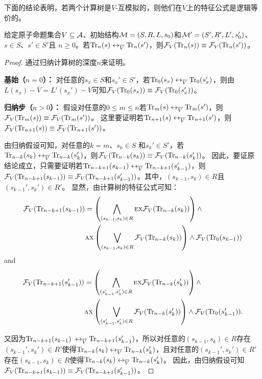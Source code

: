下面的结论表明，若两个计算树是$V$-互模拟的，则他们在$V$上的特征公式是逻辑等价的。
\begin{lemma}\label{lem:Vb:TrFormula:Equ}
	给定原子命题集合$V\subseteq {\cal A}$、初始结构${\cal M}=(S,R,L,s_0)$和${\cal M}'=(S',R',L',s_0')$、$s\in S$、$s'\in S'$且 $n\ge 0$。若$\textrm{Tr}_n(s) \leftrightarrow_{\overline V} \textrm{Tr}_n(s')$，则${\cal F}_V(\textrm{Tr}_n(s)) \equiv {\cal F}_V(\textrm{Tr}_n(s'))$。
\end{lemma}
\begin{proof}
	通过归纳计算树的深度$n$来证明。
	
	\textbf{基始（$n=0$）：} 对任意的$s_x\in S$和$s_x' \in S'$，若$\textrm{Tr}_0(s_x) \leftrightarrow_{\overline V} \textrm{Tr}_0(s_x')$，则由$L(s_x) - \overline V = L'(s_x') - \overline V$可知${\cal F}_V(\textrm{Tr}_0(s_x)) \equiv {\cal F}_V(\textrm{Tr}_0(s_x'))$。
	
	\textbf{归纳步（$n>0$）：} 假设对任意的$0\leq m \leq n$若$\textrm{Tr}_m(s) \leftrightarrow_{\overline V} \textrm{Tr}_m(s')$，则${\cal F}_V(\textrm{Tr}_m(s)) \equiv {\cal F}_V(\textrm{Tr}_m(s'))$。
	这里要证明若$\textrm{Tr}_{n+1}(s) \leftrightarrow_{\overline V} \textrm{Tr}_{n+1}(s')$，则${\cal F}_V(\textrm{Tr}_{n+1}(s)) \equiv {\cal F}_V(\textrm{Tr}_{n+1}(s'))$。
	
	由归纳假设可知，对任意的$k=m$、$s_k\in S$ 和$s_k'\in S'$，若$\textrm{Tr}_{n-k}(s_k) \leftrightarrow_{\overline V} \textrm{Tr}_{n-k}(s_k')$，则${\cal F}_V(\textrm{Tr}_{n-k}(s_k)) \equiv {\cal F}_V(\textrm{Tr}_{n-k}(s_k'))$。
	因此，要证原结论成立，只需要证明若$\textrm{Tr}_{n-k+1}(s_{k-1}) \leftrightarrow_{\overline V} \textrm{Tr}_{n-k+1}(s_{k-1}')$，则${\cal F}_V(\textrm{Tr}_{n-k+1}(s_{k-1})) \equiv {\cal F}_V(\textrm{Tr}_{n-k+1}(s_{k-1}'))$。其中，$(s_{k-1},s_k)\in R$且$(s_{k-1}',s_k')\in R'$。
	显然，由计算树的特征公式可知：
	\begin{align*}
		{\cal F}_V(\textrm{Tr}_{n-k+1}(s_{k-1})) &  =
		\left(\bigwedge_{(s_{k-1},s_k)\in R}
		\textsc{e} \textsc{x} {\cal F}_V(\textrm{Tr}_{n-k}(s_k))\right)
		\wedge \\
		&\textsc{a} \textsc{x}\left(\bigvee_{(s_{k-1},s_k)\in R}
		{\cal F}_V(\textrm{Tr}_{n-k}(s_k) )\right)
		\wedge {\cal F}_V(\textrm{Tr}_0(s_{k-1}))
	\end{align*}
	and
	\begin{align*}
		{\cal F}_V(\textrm{Tr}_{n-k+1}(s_{k-1}')) &  =
		\left(\bigwedge_{(s_{k-1}',s_k')\in R}
		\textsc{e} \textsc{x} {\cal F}_V(\textrm{Tr}_{n-k}(s_k'))\right)
		\wedge \\
		&\textsc{a} \textsc{x}\left(\bigvee_{(s_{k-1}',s_k')\in R}
		{\cal F}_V(\textrm{Tr}_{n-k}(s_k') )\right)
		\wedge {\cal F}_V(\textrm{Tr}_0(s_{k-1}')).
	\end{align*} 

	又因为$\textrm{Tr}_{n-k+1}(s_{k-1})$ $\leftrightarrow_{\overline V} \textrm{Tr}_{n-k+1}(s_{k-1}')$，所以对任意的$(s_{k-1}, s_k) \in R$存在$(s_{k-1}', s_k') \in R'$使得$\textrm{Tr}_{n-k}(s_k) \leftrightarrow_{\overline V} \textrm{Tr}_{n-k}(s_k')$，且对任意的$(s_{k-1}', s_k') \in R'$存在$(s_{k-1}, s_k) \in R$使得$\textrm{Tr}_{n-k}(s_k) \leftrightarrow_{\overline V} \textrm{Tr}_{n-k}(s_k')$。
	因此，由归纳假设可知${\cal F}_V(\textrm{Tr}_{n-k+1}(s_{k-1})) \equiv {\cal F}_V(\textrm{Tr}_{n-k+1}(s_{k-1}'))$。
\end{proof}

